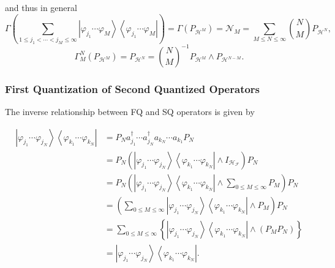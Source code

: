 \documentclass[aps,preprint]{revtex4}%
\begin{document}
and thus in general
\begin{equation}
\Gamma\left(  \sum_{1\leq j_{1}<\cdots<j_{M}\leq\infty}\left\vert
\varphi_{j_{1}}\cdots\varphi_{M}\right\rangle \left\langle \varphi_{j_{1}%
}\cdots\varphi_{M}\right\vert \right)  =\Gamma\left(  P_{\mathcal{H}^{M}%
}\right)  =\mathcal{N}_{M}=\sum_{M\leq N\leq\infty}\binom{N}{M}P_{\mathcal{H}%
^{N}},
\end{equation}%
\begin{equation}
\Gamma_{M}^{N}\left(  P_{\mathcal{H}^{M}}\right)  =P_{\mathcal{H}^{N}}%
=\binom{N}{M}^{-1}P_{\mathcal{H}^{M}}\wedge P_{\mathcal{H}^{N-M}}.
\end{equation}


\subsubsection{First Quantization of Second Quantized Operators}

The inverse relationship between FQ and SQ operators is given by%

\begin{align}
\left\vert \varphi_{j_{1}}\cdots\varphi_{j_{N}}\right\rangle \left\langle
\varphi_{k_{1}}\cdots\varphi_{k_{N}}\right\vert  &  =P_{N}a_{j_{1}}^{\dagger
}\cdots a_{j_{N}}^{\dagger}a_{k_{N}}\cdots a_{k_{1}}P_{N}\nonumber\\
&  =P_{N}\left(  \left\vert \varphi_{j_{1}}\cdots\varphi_{j_{N}}\right\rangle
\left\langle \varphi_{k_{1}}\cdots\varphi_{k_{N}}\right\vert \wedge
I_{\mathcal{H}_{\mathcal{F}}}\right)  P_{N}\nonumber\\
&  =P_{N}\left(  \left\vert \varphi_{j_{1}}\cdots\varphi_{j_{N}}\right\rangle
\left\langle \varphi_{k_{1}}\cdots\varphi_{k_{N}}\right\vert \wedge\sum_{0\leq
M\leq\infty}P_{M}\right)  P_{N}\nonumber\\
&  =\left(  \sum_{0\leq M\leq\infty}\left\vert \varphi_{j_{1}}\cdots
\varphi_{j_{N}}\right\rangle \left\langle \varphi_{k_{1}}\cdots\varphi_{k_{N}%
}\right\vert \wedge P_{M}\right)  P_{N}\nonumber\\
&  =\sum_{0\leq M\leq\infty}\left\{  \left\vert \varphi_{j_{1}}\cdots
\varphi_{j_{N}}\right\rangle \left\langle \varphi_{k_{1}}\cdots\varphi_{k_{N}%
}\right\vert \wedge\left(  P_{M}P_{N}\right)  \right\} \nonumber\\
&  =\left\vert \varphi_{j_{1}}\cdots\varphi_{j_{N}}\right\rangle \left\langle
\varphi_{k_{1}}\cdots\varphi_{k_{N}}\right\vert .
\end{align}
\end{document}
